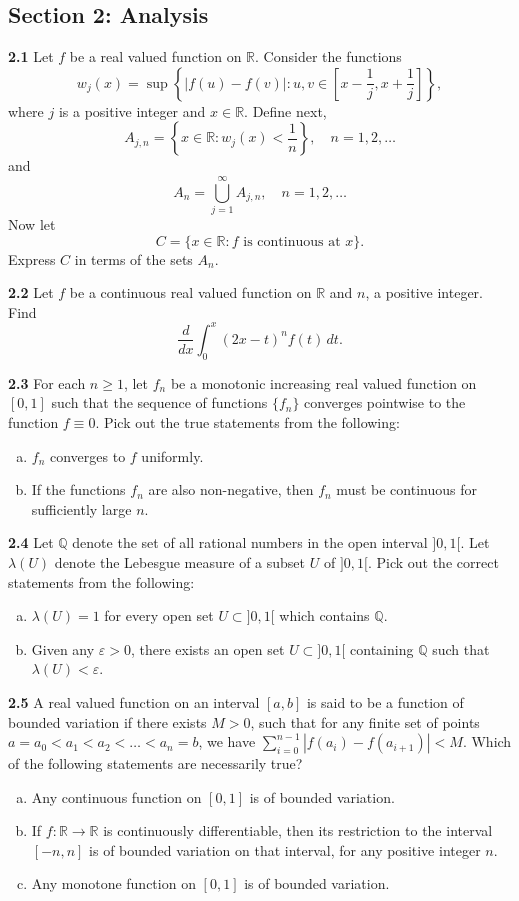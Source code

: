 \documentclass[11pt,a4paper]{article}
\newcommand{\Q}{\mathbb{Q}}
\newcommand{\R}{\mathbb{R}}
\newcommand{\examsec}[1]{%
  \subsection*{#1}
  \vspace{-2pt}
}
\newcommand{\qitem}[1]{\par\medskip\noindent\textbf{#1}\hspace{0.5em}}
\begin{document}
\examsec{Section 2: Analysis}

\qitem{2.1} Let $f$ be a real valued function on $\R$. Consider the functions
\[
  w_j(x) = \sup\left\{|f(u) - f(v)| : u, v \in \left[x - \frac{1}{j}, x + \frac{1}{j}\right]\right\},
\]
where $j$ is a positive integer and $x \in \R$. Define next,
\[
  A_{j,n} = \left\{x \in \R : w_j(x) < \frac{1}{n}\right\},\quad n = 1, 2, \dots
\]
and
\[
  A_n = \bigcup_{j=1}^{\infty} A_{j,n},\quad n = 1, 2, \dots
\]
Now let
\[
  C = \{x \in \R : f \text{ is continuous at } x\}.
\]
Express $C$ in terms of the sets $A_n$.

\qitem{2.2} Let $f$ be a continuous real valued function on $\R$ and $n$, a positive integer. Find
\[
  \frac{d}{dx} \int_0^x (2x - t)^n f(t)\,dt.
\]

\qitem{2.3} For each $n \ge 1$, let $f_n$ be a monotonic increasing real valued function on $[0, 1]$ such that the sequence of functions $\{f_n\}$ converges pointwise to the function $f \equiv 0$. Pick out the true statements from the following:
\begin{enumerate}[a.]
  \item $f_n$ converges to $f$ uniformly.
  \item If the functions $f_n$ are also non-negative, then $f_n$ must be continuous for sufficiently large $n$.
\end{enumerate}

\qitem{2.4} Let $\Q$ denote the set of all rational numbers in the open interval $]0, 1[$. Let $\lambda(U)$ denote the Lebesgue measure of a subset $U$ of $]0, 1[$. Pick out the correct statements from the following:
\begin{enumerate}[a.]
  \item $\lambda(U) = 1$ for every open set $U \subset ]0, 1[$ which contains $\Q$.
  \item Given any $\varepsilon > 0$, there exists an open set $U \subset ]0, 1[$ containing $\Q$ such that $\lambda(U) < \varepsilon$.
\end{enumerate}

\qitem{2.5} A real valued function on an interval $[a, b]$ is said to be a function of bounded variation if there exists $M > 0$, such that for any finite set of points $a = a_0 < a_1 < a_2 < \dots < a_n = b$, we have $\sum_{i=0}^{n-1} |f(a_i) - f(a_{i+1})| < M$. Which of the following statements are necessarily true?
\begin{enumerate}[a.]
  \item Any continuous function on $[0, 1]$ is of bounded variation.
  \item If $f : \R \to \R$ is continuously differentiable, then its restriction to the interval $[-n, n]$ is of bounded variation on that interval, for any positive integer $n$.
  \item Any monotone function on $[0, 1]$ is of bounded variation.
\end{enumerate}
\end{document}
